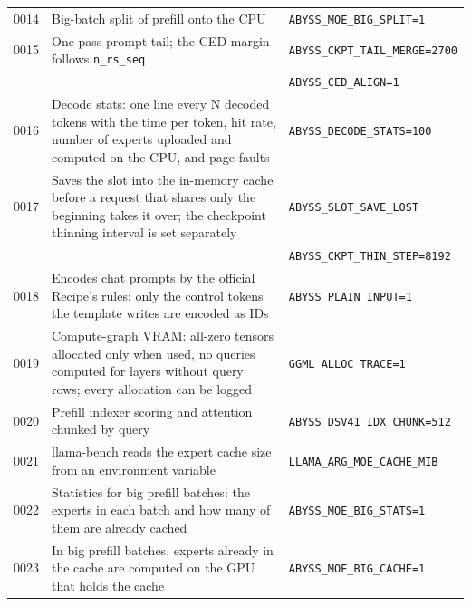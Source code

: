 \documentclass[11pt,a4paper]{article}
\newcommand{\code}[1]{\texttt{#1}}
\begin{document}
\begin{table}[h]
\begin{tabularx}{\textwidth}{@{}l X l@{}}
    0014 & Big-batch split of prefill onto the CPU & \code{ABYSS\_MOE\_BIG\_SPLIT=1} \\
    0015 & One-pass prompt tail; the CED margin follows \code{n\_rs\_seq} & \code{ABYSS\_CKPT\_TAIL\_MERGE=2700} \\
         & & \code{ABYSS\_CED\_ALIGN=1} \\
    0016 & Decode stats: one line every N decoded tokens with the time per token, hit rate, number of experts uploaded and computed on the CPU, and page faults & \code{ABYSS\_DECODE\_STATS=100} \\
    0017 & Saves the slot into the in-memory cache before a request that shares only the beginning takes it over; the checkpoint thinning interval is set separately & \code{ABYSS\_SLOT\_SAVE\_LOST} \\
         & & \code{ABYSS\_CKPT\_THIN\_STEP=8192} \\
    0018 & Encodes chat prompts by the official Recipe's rules: only the control tokens the template writes are encoded as IDs & \code{ABYSS\_PLAIN\_INPUT=1} \\
    0019 & Compute-graph VRAM: all-zero tensors allocated only when used, no queries computed for layers without query rows; every allocation can be logged & \code{GGML\_ALLOC\_TRACE=1} \\
    0020 & Prefill indexer scoring and attention chunked by query & \code{ABYSS\_DSV41\_IDX\_CHUNK=512} \\
    0021 & llama-bench reads the expert cache size from an environment variable & \code{LLAMA\_ARG\_MOE\_CACHE\_MIB} \\
    0022 & Statistics for big prefill batches: the experts in each batch and how many of them are already cached & \code{ABYSS\_MOE\_BIG\_STATS=1} \\
    0023 & In big prefill batches, experts already in the cache are computed on the GPU that holds the cache & \code{ABYSS\_MOE\_BIG\_CACHE=1} \\
    \bottomrule
  \end{tabularx}
\end{table}
\end{document}
